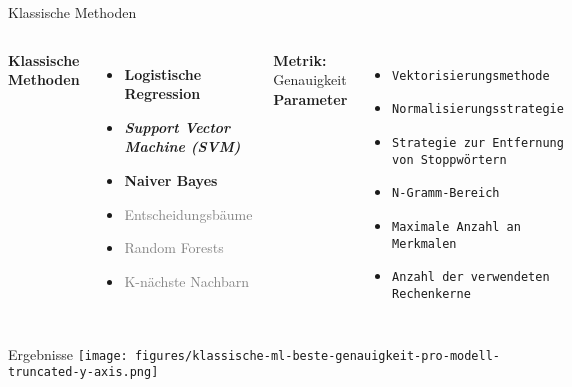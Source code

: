 \documentclass[aspectratio=169]{beamer} %
\begin{document}
\begin{frame}{Klassische Methoden}
  \fontsize{10pt}{12pt}\selectfont
  \vspace{0.3cm}

  \begin{columns}
      \textbf{Klassische Methoden}
      \vspace{0.3cm}
      \begin{itemize}
          \item \textbf{Logistische Regression}
          \item \textbf{\textit{Support Vector Machine (SVM)}}
          \item \textbf{Naiver Bayes}
          \item \textcolor{gray}{Entscheidungsbäume}
          \item \textcolor{gray}{Random Forests}
          \item \textcolor{gray}{K-nächste Nachbarn}
      \end{itemize}
      \vspace{0.5cm}
  \textbf{Metrik:} Genauigkeit
    \vspace{-0.5cm}
      \textbf{Parameter}
      \vspace{0.3cm}
      \begin{itemize}
    \item \texttt{Vektorisierungsmethode}
    \item \texttt{Normalisierungsstrategie}
    \item \texttt{Strategie zur Entfernung von Stoppwörtern}
    \item \texttt{N-Gramm-Bereich}
    \item \texttt{Maximale Anzahl an Merkmalen}
    \item \texttt{Anzahl der verwendeten Rechenkerne}
\end{itemize}
  \end{columns}
\end{frame}


\begin{frame}{Ergebnisse}
    \centering
    \texttt{[image: figures/klassische-ml-beste-genauigkeit-pro-modell-truncated-y-axis.png]}
\end{frame}
\end{document}
